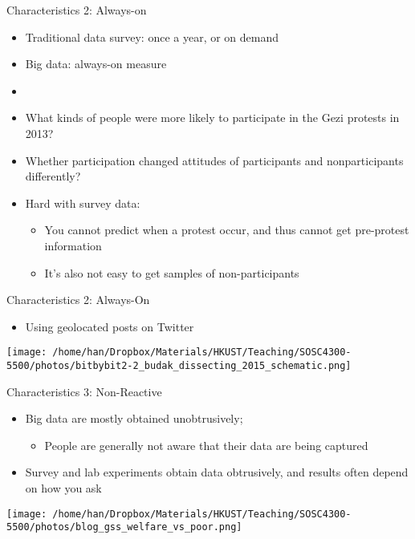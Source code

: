 \documentclass[handout]{beamer}
\begin{document}
\begin{frame}[label={h:4241083b-08f4-420a-ab2e-711b9619f61e}]{Characteristics 2: Always-on}
\begin{itemize}
\item Traditional data survey: once a year, or on demand
\item Big data: always-on measure
\item {}
\item What kinds of people were more likely to participate in the Gezi protests in 2013?
\item Whether participation changed attitudes of participants and nonparticipants differently?
\item Hard with survey data: 
\begin{itemize}
\item You cannot predict when a protest occur, and thus cannot get \alert{pre-protest} information
\item It's also not easy to get samples of non-participants
\end{itemize}
\end{itemize}
\end{frame}

\begin{frame}[label={h:d747f547-58e1-4be5-9d71-f7ec2f4a73f6}]{Characteristics 2: Always-On}
\begin{itemize}
\item Using geolocated posts on Twitter
\end{itemize}
\begin{center}
\texttt{[image: /home/han/Dropbox/Materials/HKUST/Teaching/SOSC4300-5500/photos/bitbybit2-2\_budak\_dissecting\_2015\_schematic.png]}
\end{center}
\end{frame}
\begin{frame}[label={h:9ee50f3d-8419-475e-8908-08a611ba651b}]{Characteristics 3: Non-Reactive}
\begin{itemize}
\item Big data are mostly obtained \alert{unobtrusively}; 
\begin{itemize}
\item People are generally not aware that their data are being captured
\end{itemize}
\item Survey and lab experiments obtain data \alert{obtrusively}, and results often depend on how you ask
\end{itemize}

\begin{center}
\texttt{[image: /home/han/Dropbox/Materials/HKUST/Teaching/SOSC4300-5500/photos/blog\_gss\_welfare\_vs\_poor.png]}
\end{center}
\end{frame}
\end{document}
